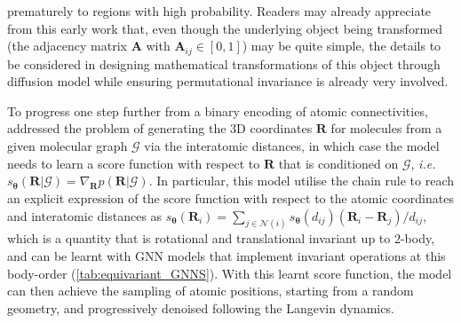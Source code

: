 prematurely to regions with high probability. Readers may already appreciate from this early work that, even though the underlying object being transformed (the adjacency matrix $\bm{A}$ with $\bm{A}_{ij}\in[0,1]$) may be quite simple, the  details to be considered in designing mathematical transformations of this object through diffusion model while ensuring permutational invariance is already very involved.

To progress one step further from a binary encoding of atomic connectivities, \citet{shi2021learning} addressed the problem of generating the 3D coordinates $\bm{R}$ for molecules from a given molecular graph $\mathcal{G}$ via the interatomic distances, in which case the model needs to learn a score function with respect to $\bm{R}$ that is conditioned on $\mathcal{G}$, \emph{i.e.} $s_{\boldsymbol{\theta}}(\bm{R}|\mathcal{G})=\nabla_{\bm{R}}p(\bm{R}|\mathcal{G})$. In particular, this model utilise the chain rule to reach an explicit expression of the score function with respect to the atomic coordinates and interatomic distances as $s_{\boldsymbol{\theta}}(\bm{R}_i)=\sum_{j\in\mathcal{N}(i)}s_{\boldsymbol{\theta}}(d_{ij})(\bm{R}_i-\bm{R}_j)/d_{ij}$, which is a quantity that is rotational and translational invariant up to 2-body, and can be learnt with GNN models that implement invariant operations at this body-order (\cref{tab:equivariant_GNNS}). With this learnt score function, the model can then achieve the sampling of atomic positions, starting from a random geometry, and progressively denoised following the Langevin dynamics.

